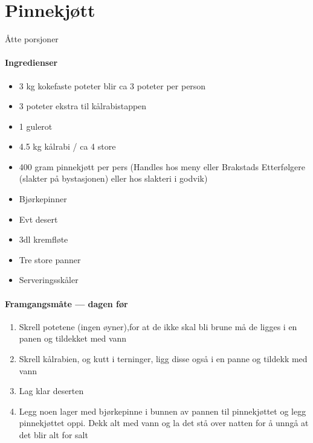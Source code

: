 \section{﻿Pinnekjøtt}
Åtte porsjoner

\paragraph{Ingredienser}
\begin{itemize}[noitemsep]
  \item 3 kg kokefaste poteter blir ca 3 poteter per person
  \item 3 poteter ekstra til kålrabistappen
  \item 1 gulerot
  \item 4.5 kg kålrabi / ca 4 store
  \item 400 gram pinnekjøtt per pers (Handles hos meny eller Brakstads Etterfølgere (slakter på bystasjonen) eller hos slakteri i godvik)
  \item Bjørkepinner
  \item Evt desert
  \item 3dl kremfløte
  \item Tre store panner
  \item Serveringsskåler
\end{itemize}

\paragraph{Framgangsmåte --- dagen før}
\begin{enumerate}[noitemsep]
  \item Skrell potetene (ingen øyner),for at de ikke skal bli brune må de ligges i en panen og tildekket med vann
  \item Skrell kålrabien, og kutt i terninger, ligg disse også i en panne og tildekk med vann
  \item Lag klar deserten
  \item Legg noen lager med bjørkepinne i bunnen av pannen til pinnekjøttet og legg pinnekjøttet oppi. Dekk alt med vann og la det stå over natten for å unngå at det blir alt for salt
\end{enumerate}

